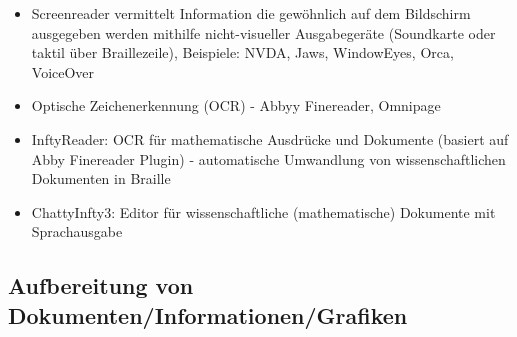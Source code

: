 \documentclass[paper=a4, fontsize=11pt]{scrartcl} %
\numberwithin{equation}{section} %
\numberwithin{figure}{section} %
\numberwithin{table}{section} %
\begin{document}
\begin{itemize}
\item Screenreader vermittelt Information die gewöhnlich auf dem Bildschirm ausgegeben werden mithilfe nicht-visueller Ausgabegeräte (Soundkarte oder taktil über Braillezeile), Beispiele: NVDA, Jaws, WindowEyes, Orca, VoiceOver
\item Optische Zeichenerkennung (OCR) - Abbyy Finereader, Omnipage
\item InftyReader: OCR für mathematische Ausdrücke und Dokumente (basiert auf Abby Finereader Plugin) - automatische Umwandlung von wissenschaftlichen Dokumenten in Braille
\item ChattyInfty3: Editor für wissenschaftliche (mathematische) Dokumente mit Sprachausgabe
\end{itemize}

\subsection{Aufbereitung von Dokumenten/Informationen/Grafiken}
\end{document}
